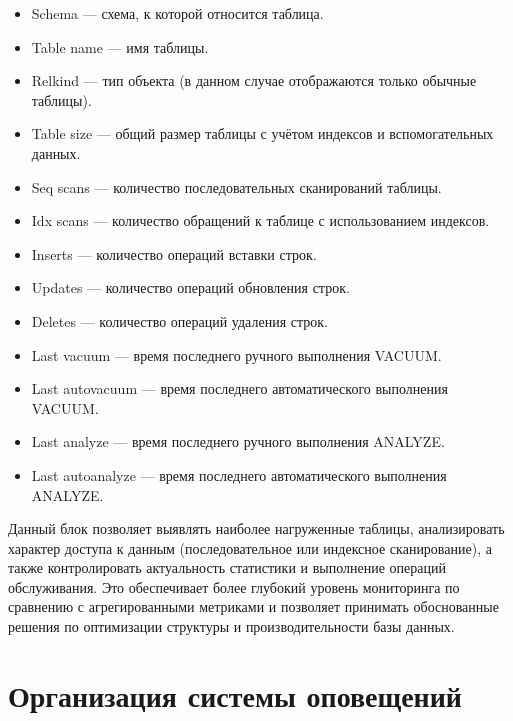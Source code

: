 \begin{itemize}
	\item Schema — схема, к которой относится таблица.
	
	\item Table name — имя таблицы.
	
	\item Relkind — тип объекта (в данном случае отображаются только обычные таблицы).
	
	\item Table size — общий размер таблицы с учётом индексов и вспомогательных данных.
	
	\item Seq scans — количество последовательных сканирований таблицы.
	
	\item Idx scans — количество обращений к таблице с использованием индексов.
	
	\item Inserts — количество операций вставки строк.
	
	\item Updates — количество операций обновления строк.
	
	\item Deletes — количество операций удаления строк.
	
	\item Last vacuum — время последнего ручного выполнения VACUUM.
	
	\item Last autovacuum — время последнего автоматического выполнения VACUUM.
	
	\item Last analyze — время последнего ручного выполнения ANALYZE.
	
	\item Last autoanalyze — время последнего автоматического выполнения ANALYZE.
\end{itemize}

Данный блок позволяет выявлять наиболее нагруженные таблицы, анализировать характер доступа к данным (последовательное или индексное сканирование), а также контролировать актуальность статистики и выполнение операций обслуживания. Это обеспечивает более глубокий уровень мониторинга по сравнению с агрегированными метриками и позволяет принимать обоснованные решения по оптимизации структуры и производительности базы данных.

\section{Организация системы оповещений} \label{ch2:alerts}

